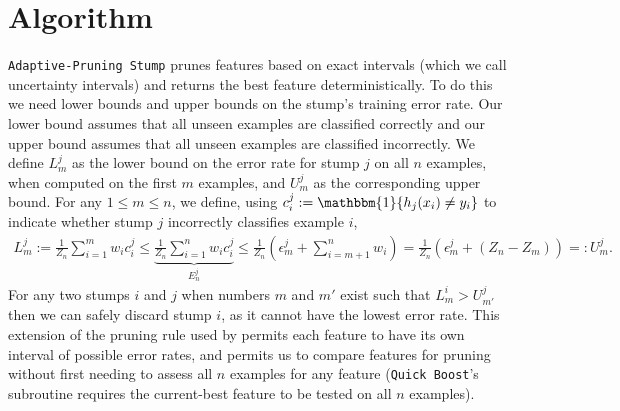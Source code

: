 \section{Algorithm}\label{alg}
\texttt{Adaptive-Pruning Stump} prunes features based on
exact intervals (which we call uncertainty intervals) and returns the best feature
deterministically.
To do this we need lower bounds and upper bounds on the stump's
training error rate. 
Our lower bound assumes that all unseen examples are classified
correctly and our upper bound assumes that all unseen examples are classified
incorrectly.
We define $L_m^j$ as the lower bound on the error rate for
stump $j$ on all $n$ examples, when computed on the first $m$ examples,
and $U_m^j$ as the corresponding upper bound.
For any $1 \le m \le n$, we define,
using $c^j_i := \mathbbm{1} \{h_j(x_i) \ne y_i\}$ to indicate
whether stump $j$ incorrectly classifies example $i$,
\begin{align*}
	L_m^j :=
	 \frac{1}{Z_n}
		\sum_{i=1}^m {w_i c^j_i}
	\le  
	\underbrace{
	\frac{1}{Z_n} 
		\sum_{i=1}^n {w_i c^j_i}
	}_{E_n^j}
	\le  \frac{1}{Z_n}\left(
		\epsilon^j_m
		+ \sum_{i=m+1}^n w_i
		\right)
	=
	\frac{1}{Z_n}\left(
		\epsilon^j_m
		+ (Z_n - Z_m)
		\right)
		=: U_m^j.
\end{align*}
%
For any two stumps $i$ and $j$ when numbers $m$ and $m'$ exist
such that $L_m^i > U_{m'}^j$ then we can safely discard stump $i$, as it cannot
have the lowest error rate.
This extension of the pruning rule used by \citet{icml2013_appel13}
permits each feature to have its own interval of possible error
rates, and permits us to compare features for pruning without first
needing to assess all $n$ examples for any feature
(\texttt{Quick Boost}'s subroutine requires the
current-best feature to be tested on all $n$ examples).

